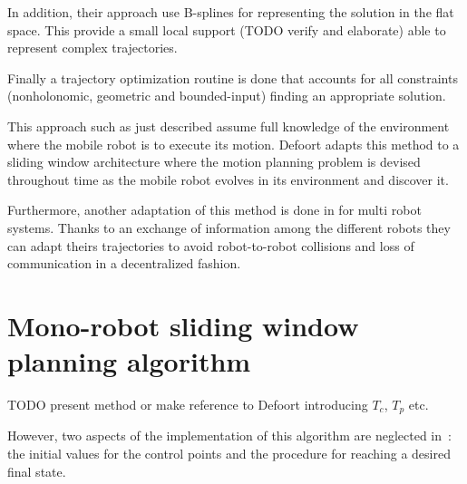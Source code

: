 \documentclass[eprint]{actapoly}
\begin{document}
In addition, their approach use B-splines for representing the solution in the flat space. This provide a small local support (TODO verify and elaborate) able to represent
complex trajectories.

Finally a trajectory optimization routine is done that accounts for all constraints (nonholonomic, geometric and bounded-input) finding an appropriate
solution.

This approach such as just described assume full knowledge of the environment where the mobile robot is to execute its motion. Defoort adapts this
method to a sliding window architecture where the motion planning problem is devised throughout time as the mobile robot evolves in its environment and
discover it.

Furthermore, another adaptation of this method is done in \cite{Defoort2007a} for multi robot systems. Thanks to an exchange of information
among the different robots they can adapt theirs trajectories to avoid robot-to-robot collisions and loss of communication in a decentralized fashion.


\section{Mono-robot sliding window planning algorithm}

TODO present method or make reference to Defoort introducing $T_c$, $T_p$ etc.

However, two aspects of the implementation of this algorithm are neglected in~\cite{Defoort2007a}: the initial values for
the control points and the procedure for reaching a desired final state.

%
%
\end{document}
